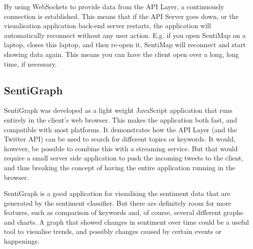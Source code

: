 By using WebSockets to provide data from the API Layer, a continuously connection is established. This means that if the API Server goes down, or the visualisation application back-end server restarts, the application will automatically reconnect without any user action. E.g. if you open SentiMap on a laptop, closes this laptop, and then re-open it, SentiMap will reconnect and start showing data again. This means you can have the client open over a long, long time, if necessary.   

\subsection{SentiGraph}
SentiGraph was developed as a light weight JavaScript application that runs entirely in the client's web browser. This makes the application both fast, and compatible with most platforms. It demonstrates how the API Layer (and the Twitter API) can be used to search for different topics or keywords. It would, however, be possible to combine this with a streaming service. But that would require a small server side application to push the incoming tweets to the client, and thus breaking the concept of having the entire application running in the browser.

SentiGraph is a good application for visualising the sentiment data that are generated by the sentiment classifier. But there are definitely room for more features, such as comparison of keywords and, of course, several different graphs and charts. A graph that showed changes in sentiment over time could be a useful tool to visualise trends, and possibly changes caused by certain events or happenings. 




